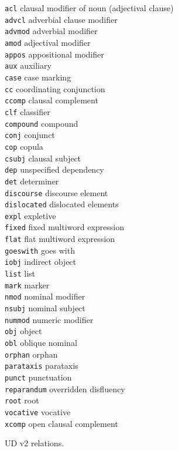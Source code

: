 \begin{table}[H]
\footnotesize
\begin{multicols}{2}
\texttt{acl} clausal modifier of noun (adjectival clause) \\
\texttt{advcl} adverbial clause modifier \\
\texttt{advmod} adverbial modifier \\
\texttt{amod} adjectival modifier \\
\texttt{appos} appositional modifier \\
\texttt{aux} auxiliary \\
\texttt{case} case marking \\
\texttt{cc} coordinating conjunction \\
\texttt{ccomp} clausal complement \\
\texttt{clf} classifier \\
\texttt{compound} compound \\
\texttt{conj} conjunct \\
\texttt{cop} copula \\
\texttt{csubj} clausal subject \\
\texttt{dep} unspecified dependency \\
\texttt{det} determiner \\
\texttt{discourse} discourse element \\
\texttt{dislocated} dislocated elements \\
\texttt{expl} expletive \\
\texttt{fixed} fixed multiword expression \\
\texttt{flat} flat multiword expression \\
\texttt{goeswith} goes with \\
\texttt{iobj} indirect object \\
\texttt{list} list \\
\texttt{mark} marker \\
\texttt{nmod} nominal modifier \\
\texttt{nsubj} nominal subject \\
\texttt{nummod} numeric modifier \\
\texttt{obj} object \\
\texttt{obl} oblique nominal \\
\texttt{orphan} orphan \\
\texttt{parataxis} parataxis \\
\texttt{punct} punctuation \\
\texttt{reparandum} overridden disfluency \\
\texttt{root} root \\
\texttt{vocative} vocative \\
\texttt{xcomp} open clausal complement
\end{multicols}
\caption{UD v2 relations.\label{tab:ud}}
\end{table}

